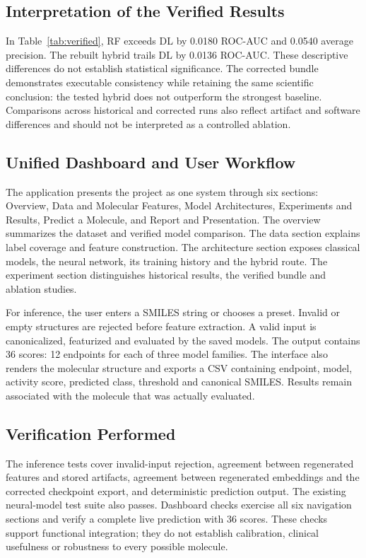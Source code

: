\documentclass[11pt,a4paper]{article}\usepackage[margin=25mm]{geometry}\usepackage{fancyhdr}\usepackage{setspace}\usepackage{titlesec}\usepackage{xcolor}
\begin{document}
\subsection{Interpretation of the Verified Results}
In Table~\ref{tab:verified}, RF exceeds DL by 0.0180 ROC-AUC and 0.0540 average precision. The rebuilt hybrid trails DL by 0.0136 ROC-AUC. These descriptive differences do not establish statistical significance. The corrected bundle demonstrates executable consistency while retaining the same scientific conclusion: the tested hybrid does not outperform the strongest baseline. Comparisons across historical and corrected runs also reflect artifact and software differences and should not be interpreted as a controlled ablation.


\subsection{Unified Dashboard and User Workflow}
The application presents the project as one system through six sections: Overview, Data and Molecular Features, Model Architectures, Experiments and Results, Predict a Molecule, and Report and Presentation. The overview summarizes the dataset and verified model comparison. The data section explains label coverage and feature construction. The architecture section exposes classical models, the neural network, its training history and the hybrid route. The experiment section distinguishes historical results, the verified bundle and ablation studies.

For inference, the user enters a SMILES string or chooses a preset. Invalid or empty structures are rejected before feature extraction. A valid input is canonicalized, featurized and evaluated by the saved models. The output contains 36 scores: 12 endpoints for each of three model families. The interface also renders the molecular structure and exports a CSV containing endpoint, model, activity score, predicted class, threshold and canonical SMILES. Results remain associated with the molecule that was actually evaluated.

\subsection{Verification Performed}
The inference tests cover invalid-input rejection, agreement between regenerated features and stored artifacts, agreement between regenerated embeddings and the corrected checkpoint export, and deterministic prediction output. The existing neural-model test suite also passes. Dashboard checks exercise all six navigation sections and verify a complete live prediction with 36 scores. These checks support functional integration; they do not establish calibration, clinical usefulness or robustness to every possible molecule.
\end{document}
